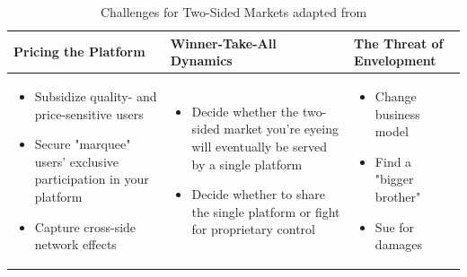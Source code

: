 \begin{table}[t]
	\caption[Challenges for Two-Sided Markets]{Challenges for Two-Sided Markets adapted from \citet{Eisenmann2006}}
	\label{tab:stsm}
	\centering
	\begin{tabular}{L{.3\textwidth}L{.3\textwidth}L{.3\textwidth}}
			\toprule 
			\small \textbf{Pricing the Platform} &
			\small \textbf{Winner-Take-All Dynamics} &
			\small \textbf{The Threat of Envelopment} \\ \midrule
			\vspace{-4mm}
			\begin{itemize}[leftmargin=*, parsep=0pt, topsep=0pt, itemsep=0pt]
				\item \small Subsidize quality- and price-sensitive users
				\item \small Secure "marquee" users' exclusive participation in your platform
				\item \small Capture cross-side network effects \vspace{-\baselineskip} 
			\end{itemize} &
			\vspace{-4mm}
			\begin{itemize}[leftmargin=*, parsep=0pt, topsep=0pt, itemsep=0pt]
				\item \small Decide whether the two-sided market you're eyeing will eventually be served by a single platform
				\item \small Decide whether to share the single platform or fight for proprietary control \vspace{-\baselineskip} 
			\end{itemize}	&
			\vspace{-4mm}
			\begin{itemize}[leftmargin=*, parsep=0pt, topsep=0pt, itemsep=0pt]
				\item \small Change business model
				\item \small Find a "bigger brother"
				\item \small Sue for damages \vspace{-\baselineskip} 
			\end{itemize}\\ \bottomrule
	\end{tabular}
\end{table}

